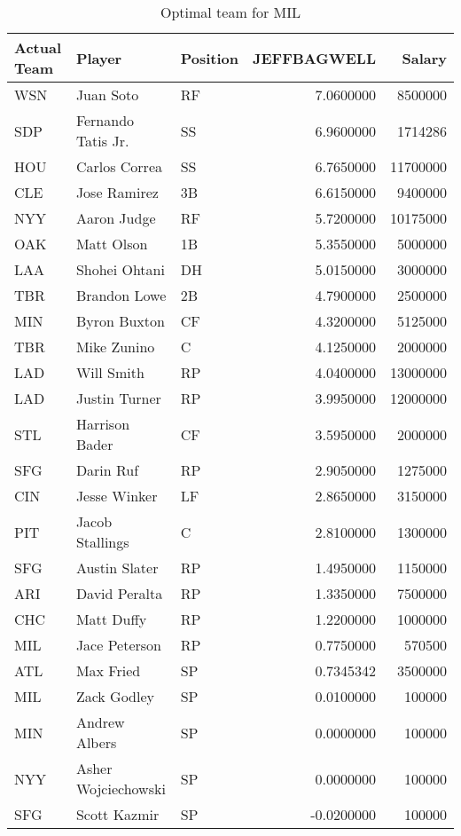\begin{table}

\caption{Optimal team for MIL}
\centering
\begin{tabular}[t]{l|l|l|r|r}
\hline
Actual Team & Player & Position & JEFFBAGWELL & Salary\\
\hline
WSN & Juan Soto & RF & 7.0600000 & 8500000\\
\hline
SDP & Fernando Tatis Jr. & SS & 6.9600000 & 1714286\\
\hline
HOU & Carlos Correa & SS & 6.7650000 & 11700000\\
\hline
CLE & Jose Ramirez & 3B & 6.6150000 & 9400000\\
\hline
NYY & Aaron Judge & RF & 5.7200000 & 10175000\\
\hline
OAK & Matt Olson & 1B & 5.3550000 & 5000000\\
\hline
LAA & Shohei Ohtani & DH & 5.0150000 & 3000000\\
\hline
TBR & Brandon Lowe & 2B & 4.7900000 & 2500000\\
\hline
MIN & Byron Buxton & CF & 4.3200000 & 5125000\\
\hline
TBR & Mike Zunino & C & 4.1250000 & 2000000\\
\hline
LAD & Will Smith & RP & 4.0400000 & 13000000\\
\hline
LAD & Justin Turner & RP & 3.9950000 & 12000000\\
\hline
STL & Harrison Bader & CF & 3.5950000 & 2000000\\
\hline
SFG & Darin Ruf & RP & 2.9050000 & 1275000\\
\hline
CIN & Jesse Winker & LF & 2.8650000 & 3150000\\
\hline
PIT & Jacob Stallings & C & 2.8100000 & 1300000\\
\hline
SFG & Austin Slater & RP & 1.4950000 & 1150000\\
\hline
ARI & David Peralta & RP & 1.3350000 & 7500000\\
\hline
CHC & Matt Duffy & RP & 1.2200000 & 1000000\\
\hline
MIL & Jace Peterson & RP & 0.7750000 & 570500\\
\hline
ATL & Max Fried & SP & 0.7345342 & 3500000\\
\hline
MIL & Zack Godley & SP & 0.0100000 & 100000\\
\hline
MIN & Andrew Albers & SP & 0.0000000 & 100000\\
\hline
NYY & Asher Wojciechowski & SP & 0.0000000 & 100000\\
\hline
SFG & Scott Kazmir & SP & -0.0200000 & 100000\\
\hline
\end{tabular}
\end{table}

